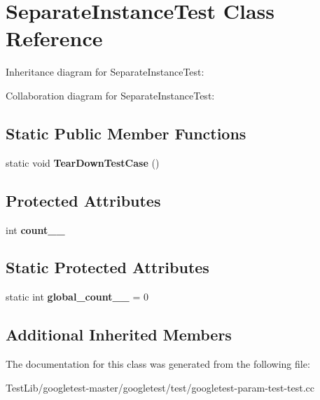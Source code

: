 \hypertarget{classSeparateInstanceTest}{}\section{Separate\+Instance\+Test Class Reference}
\label{classSeparateInstanceTest}


Inheritance diagram for Separate\+Instance\+Test\+:


Collaboration diagram for Separate\+Instance\+Test\+:
\subsection*{Static Public Member Functions}
\begin{DoxyCompactItemize}
\item 
\mbox{\label{classSeparateInstanceTest_a7c4a72843a7c4a9be56adef27ecd33c7}} 
static void {\bfseries Tear\+Down\+Test\+Case} ()
\end{DoxyCompactItemize}
\subsection*{Protected Attributes}
\begin{DoxyCompactItemize}
\item 
\mbox{\label{classSeparateInstanceTest_a04af1b3b711671ecb0778af1330a740f}} 
int {\bfseries count_\+\_\+}
\end{DoxyCompactItemize}
\subsection*{Static Protected Attributes}
\begin{DoxyCompactItemize}
\item 
\mbox{\label{classSeparateInstanceTest_a79db6d4cdd6c99b256439cc020f782ef}} 
static int {\bfseries global\+\_\+count_\+\_\+} = 0
\end{DoxyCompactItemize}
\subsection*{Additional Inherited Members}


The documentation for this class was generated from the following file\+:\begin{DoxyCompactItemize}
\item 
Test\+Lib/googletest-\/master/googletest/test/googletest-\/param-\/test-\/test.\+cc\end{DoxyCompactItemize}
